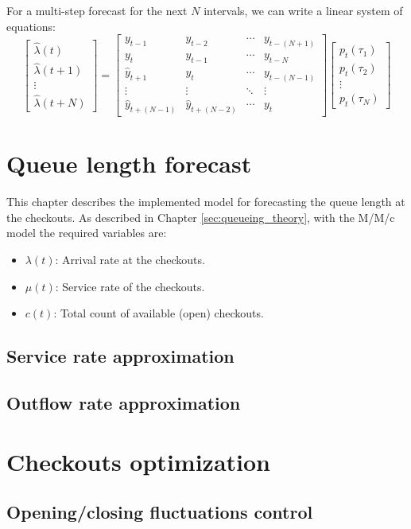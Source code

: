 For a multi-step forecast for the next \( N \) intervals, we can write a linear system of equations:
\[
  \begin{bmatrix}\hat{\lambda}(t) \\ \hat{\lambda}(t+1) \\ \vdots \\ \hat{\lambda}(t+N)\end{bmatrix}
  =
  \begin{bmatrix}
    y_{t-1}           & y_{t-2}           & \cdots & y_{t-(N+1)} \\
    y_{t}             & y_{t-1}           & \cdots & y_{t-N}     \\
    \hat{y}_{t+1}     & y_{t}             & \cdots & y_{t-(N-1)} \\
    \vdots            & \vdots            & \ddots & \vdots      \\
    \hat{y}_{t+(N-1)} & \hat{y}_{t+(N-2)} & \cdots & y_{t}
  \end{bmatrix}
  \begin{bmatrix}p_t(\tau_1) \\ p_t(\tau_2) \\ \vdots \\ p_t(\tau_N)\end{bmatrix}
\]

\section{Queue length forecast}
\label{sec:queue_length_forecasting}
This chapter describes the implemented model for forecasting the queue length at the checkouts. As described in Chapter \ref{sec:queueing_theory}, with the M/M/c model the required variables are:
\begin{itemize}
  \item \( \lambda(t) \): Arrival rate at the checkouts.
  \item \( \mu(t) \): Service rate of the checkouts.
  \item \( c(t) \): Total count of available (open) checkouts.
\end{itemize}

\subsection{Service rate approximation}
\label{subsec:service_rate_approximation}


\subsection{Outflow rate approximation}
\label{subsec:outflow_rate_approximation}

\section{Checkouts optimization}
\label{sec:checkouts_optimization}

\subsection{Opening/closing fluctuations control}
\label{subsec:opening_closing_fluctuations_control}

\clearpage